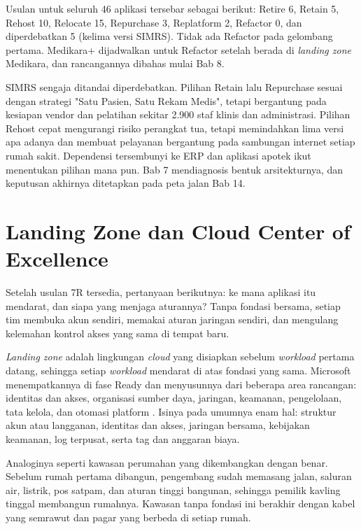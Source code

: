 \begin{kasus}[title={Kasus Medikara Health: Usulan 7R untuk Lima Aplikasi Utama}]
  Usulan untuk seluruh 46 aplikasi tersebar sebagai berikut: Retire 6, Retain 5, Rehost
  10, Relocate 15, Repurchase 3, Replatform 2, Refactor 0, dan diperdebatkan 5 (kelima
  versi SIMRS). Tidak ada Refactor pada gelombang pertama. Medikara+ dijadwalkan untuk
  Refactor setelah berada di \textit{landing zone} Medikara, dan rancangannya dibahas mulai
  Bab 8.

  SIMRS sengaja ditandai diperdebatkan. Pilihan Retain lalu Repurchase sesuai dengan
  strategi "Satu Pasien, Satu Rekam Medis", tetapi bergantung pada kesiapan vendor dan
  pelatihan sekitar 2.900 staf klinis dan administrasi. Pilihan Rehost cepat mengurangi
  risiko perangkat tua, tetapi memindahkan lima versi apa adanya dan membuat pelayanan
  bergantung pada sambungan internet setiap rumah sakit. Dependensi tersembunyi ke ERP
  dan aplikasi apotek ikut menentukan pilihan mana pun. Bab 7 mendiagnosis
  bentuk arsitekturnya, dan keputusan akhirnya ditetapkan pada peta jalan Bab 14.
\end{kasus}

\section{Landing Zone dan Cloud Center of Excellence}
\label{sec:ch04-landing-zone}

Setelah usulan 7R tersedia, pertanyaan berikutnya: ke mana aplikasi itu mendarat, dan
siapa yang menjaga aturannya? Tanpa fondasi bersama, setiap tim membuka akun sendiri,
memakai aturan jaringan sendiri, dan mengulang kelemahan kontrol akses yang sama di
tempat baru.

\textit{Landing zone} adalah lingkungan \textit{cloud} yang disiapkan sebelum
\textit{workload} pertama datang, sehingga setiap \textit{workload} mendarat di atas
fondasi yang sama. Microsoft menempatkannya di fase Ready dan menyusunnya dari beberapa
area rancangan: identitas dan akses, organisasi sumber daya, jaringan, keamanan,
pengelolaan, tata kelola, dan otomasi platform \cite{c04-azure-landing-zone,azurecaf}.
Isinya pada umumnya enam hal: struktur akun atau langganan, identitas dan akses,
jaringan bersama, kebijakan keamanan, log terpusat, serta tag dan anggaran biaya.

Analoginya seperti kawasan perumahan yang dikembangkan dengan benar. Sebelum rumah pertama
dibangun, pengembang sudah memasang jalan, saluran air, listrik, pos satpam, dan aturan
tinggi bangunan, sehingga pemilik kavling tinggal membangun rumahnya. Kawasan tanpa
fondasi ini berakhir dengan kabel yang semrawut dan pagar yang berbeda di setiap rumah.


